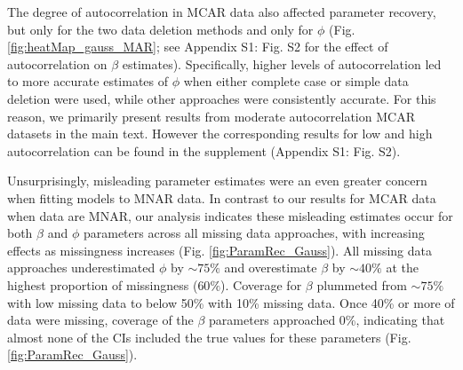 \documentclass[12pt,english]{article} %
\begin{document}
\begin{linenumbers}
\begin{spacing}{1.9}
\begin{flushleft}
\hspace{1em} The degree of autocorrelation in MCAR data also affected parameter recovery, but only for the two data deletion methods and only for $\phi$ (Fig. \ref{fig:heatMap_gauss_MAR}; see Appendix S1: Fig. S2 for the effect of autocorrelation on $\beta$ estimates). Specifically, higher levels of autocorrelation led to more accurate estimates of $\phi$ when either complete case or simple data deletion were used, while other approaches were consistently accurate. For this reason, we primarily present results from moderate autocorrelation MCAR datasets in the main text. However the corresponding results for low and high autocorrelation can be found in the supplement (Appendix S1: Fig. S2). %

\hspace{1em} Unsurprisingly, misleading parameter estimates were an even greater concern when fitting models to MNAR data.  In contrast to our results for MCAR data when data are MNAR, our analysis indicates these misleading estimates occur for both $\beta$ and $\phi$ parameters across all missing data approaches, with increasing effects as missingness increases (Fig. \ref{fig:ParamRec_Gauss}). All missing data approaches underestimated $\phi$ by $\sim75\%$ and overestimate $\beta$ by  $\sim40\%$ at the highest proportion of missingness ($60\%$).  Coverage for $\beta$ plummeted from $\sim75\%$ with low missing data to below 50\% with 10\% missing data. Once 40\% or more of data were missing, coverage of the $\beta$ parameters approached 0\%, indicating that almost none of the CIs included the true values for these parameters (Fig. \ref{fig:ParamRec_Gauss}).    


\end{flushleft}
\end{spacing}
\end{linenumbers}
\end{document}
